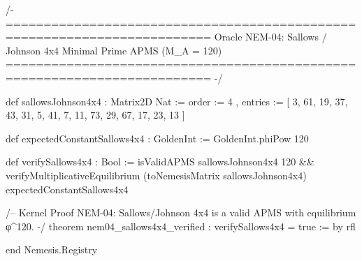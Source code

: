 \documentclass{article}
\begin{document}
\begin{lean}
/- =========================================================================
   Oracle NEM-04: Sallows / Johnson 4x4 Minimal Prime APMS (M_A = 120)
   ========================================================================= -/

def sallowsJohnson4x4 : Matrix2D Nat :=
  { order := 4
  , entries := [
       3, 61, 19, 37,
      43, 31,  5, 41,
       7, 11, 73, 29,
      67, 17, 23, 13
    ] }

def expectedConstantSallows4x4 : GoldenInt := GoldenInt.phiPow 120

def verifySallows4x4 : Bool :=
  isValidAPMS sallowsJohnson4x4 120 &&
  verifyMultiplicativeEquilibrium (toNemesisMatrix sallowsJohnson4x4) expectedConstantSallows4x4

/-- Kernel Proof NEM-04: Sallows/Johnson 4x4 is a valid APMS with equilibrium φ^120. -/
theorem nem04_sallows4x4_verified : verifySallows4x4 = true := by rfl

end Nemesis.Registry
\end{lean}
\end{document}
